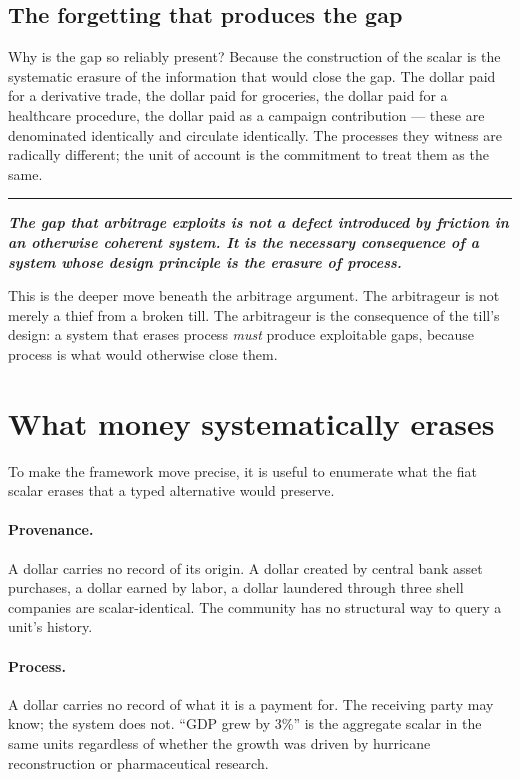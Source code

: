 \documentclass[11pt]{article}
\newcommand{\position}[1]{%
  \medskip
  \begin{quoting}[indentfirst=false, leftmargin=1em, rightmargin=1em]
  \noindent\textcolor{rhosky}{\rule{3pt}{1.2em}}\hspace{0.5em}\textbf{\textit{#1}}
  \end{quoting}
  \medskip
}
\begin{document}
\subsection{The forgetting that produces the gap}

Why is the gap so reliably present? Because the construction of the scalar is the systematic erasure of the information that would close the gap. The dollar paid for a derivative trade, the dollar paid for groceries, the dollar paid for a healthcare procedure, the dollar paid as a campaign contribution --- these are denominated identically and circulate identically. The processes they witness are radically different; the unit of account is the commitment to treat them as the same.

\position{The gap that arbitrage exploits is not a defect introduced by friction in an otherwise coherent system. It is the necessary consequence of a system whose design principle is the erasure of process.}

This is the deeper move beneath the arbitrage argument. The arbitrageur is not merely a thief from a broken till. The arbitrageur is the consequence of the till's design: a system that erases process \emph{must} produce exploitable gaps, because process is what would otherwise close them.

\section{What money systematically erases}

To make the framework move precise, it is useful to enumerate what the fiat scalar erases that a typed alternative would preserve.

\paragraph{Provenance.} A dollar carries no record of its origin. A dollar created by central bank asset purchases, a dollar earned by labor, a dollar laundered through three shell companies are scalar-identical. The community has no structural way to query a unit's history.

\paragraph{Process.} A dollar carries no record of what it is a payment for. The receiving party may know; the system does not. ``GDP grew by 3\%'' is the aggregate scalar in the same units regardless of whether the growth was driven by hurricane reconstruction or pharmaceutical research.
\end{document}

